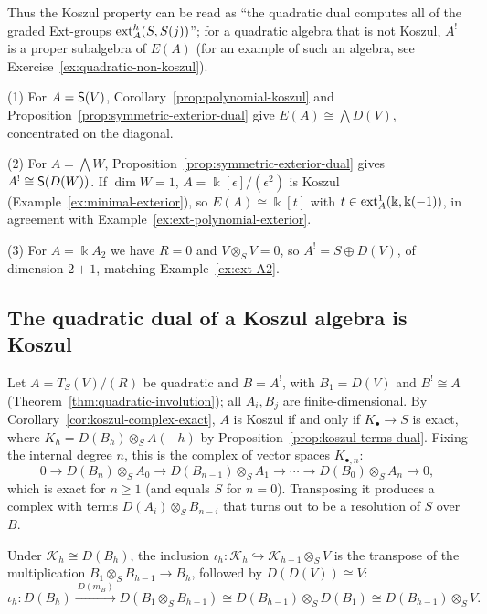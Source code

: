 Thus the Koszul property can be read as ``the quadratic dual computes all of the graded Ext-groups $\operatorname{ext}\nolimits_A^h(S,S(j))$''; for a quadratic algebra that is not Koszul, $A^!$ is a proper subalgebra of $E(A)$ (for an example of such an algebra, see Exercise~\ref{ex:quadratic-non-koszul}).

\begin{example}\label{ex:yoneda-examples}
(1) For $A=\mathsf{S}(V)$, Corollary~\ref{prop:polynomial-koszul} and Proposition~\ref{prop:symmetric-exterior-dual} give $E(A)\cong\bigwedge D(V)$, concentrated on the diagonal.

(2) For $A=\bigwedge W$, Proposition~\ref{prop:symmetric-exterior-dual} gives $A^!\cong\mathsf{S}(D(W))$.
If $\dim W=1$, $A=\Bbbk[\epsilon]/(\epsilon^2)$ is Koszul (Example~\ref{ex:minimal-exterior}), so $E(A)\cong\Bbbk[t]$ with $t\in\operatorname{ext}\nolimits^1_A(\Bbbk,\Bbbk(-1))$, in agreement with Example~\ref{ex:ext-polynomial-exterior}.

(3) For $A=\Bbbk A_2$ we have $R=0$ and $V\otimes_SV=0$, so $A^!=S\oplus D(V)$, of dimension $2+1$, matching Example~\ref{ex:ext-A2}.
\end{example}

\subsection{The quadratic dual of a Koszul algebra is Koszul}

Let $A=T_S(V)/(R)$ be quadratic and $B=A^!$, with $B_1=D(V)$ and $B^!\cong A$ (Theorem~\ref{thm:quadratic-involution}); all $A_i,B_j$ are finite-dimensional.
By Corollary~\ref{cor:koszul-complex-exact}, $A$ is Koszul if and only if $K_\bullet\to S$ is exact, where $K_h=D(B_h)\otimes_SA(-h)$ by Proposition~\ref{prop:koszul-terms-dual}.
Fixing the internal degree $n$, this is the complex of vector spaces $K_{\bullet,n}$:
\[
0\to D(B_n)\otimes_SA_0\to D(B_{n-1})\otimes_SA_1\to\cdots\to D(B_0)\otimes_SA_n\to0,
\]
which is exact for $n\geq1$ (and equals $S$ for $n=0$).
Transposing it produces a complex with terms $D(A_i)\otimes_SB_{n-i}$ that turns out to be a resolution of $S$ over $B$.

\begin{lemma}\label{lem:koszul-differential-transpose}
Under $\mathcal K_h\cong D(B_h)$, the inclusion $\iota_h:\mathcal K_h\hookrightarrow\mathcal K_{h-1}\otimes_SV$ is the transpose of the multiplication $B_1\otimes_SB_{h-1}\to B_h$, followed by $D(D(V))\cong V$:
\[
\iota_h:D(B_h)\xrightarrow{\ D(m_B)\ }D(B_1\otimes_SB_{h-1})\cong D(B_{h-1})\otimes_SD(B_1)\cong D(B_{h-1})\otimes_SV.
\]
\end{lemma}

